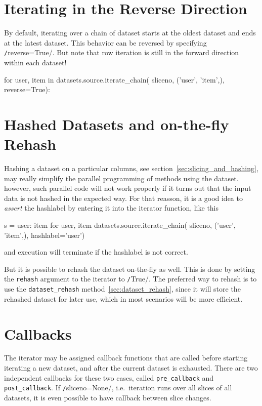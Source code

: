 \section{Iterating in the Reverse Direction}
By default, iterating over a chain of dataset starts at the oldest
dataset and ends at the latest dataset.  This behavior can be
reversed by specifying \texttt/reverse=True/.  But note
that row iteration is still in the forward direction within each
dataset!
\begin{python}
for user, item in datasets.source.iterate_chain(
    sliceno, ('user', 'item',),
    reverse=True):
\end{python}



\section{Hashed Datasets and on-the-fly Rehash}
Hashing a dataset on a particular columns, see
section~\ref{sec:slicing_and_hashing}, may really simplify the
parallel programming of methods using the dataset.  however, such
parallel code will not work properly if it turns out that the input
data is not hashed in the expected way.  For that reasson, it is a
good idea to \emph{assert} the hashlabel by entering it into the
iterator function, like this
\begin{python}
s = {user: item for user, item datasets.source.iterate_chain(
     sliceno, ('user', 'item',), hashlabel='user')}
\end{python}
and execution will terminate if the hashlabel is not correct.

But it is possible to rehash the dataset on-the-fly as well.  This is
done by setting the \texttt{rehash} argument to the iterator to
\texttt/True/.  The preferred way to rehash is to use the
\texttt{dataset\_rehash} method~\ref{sec:dataset_rehash}, since it will store the
rehashed dataset for later use, which in most scenarios will be more
efficient.






\section{Callbacks}
\label{sec:callback}
The iterator may be assigned callback functions that are called before
starting iterating a new dataset, and after the current dataset is
exhausted.  There are two independent callbacks for these two cases,
called \texttt{pre\_callback} and \texttt{post\_callback}.
If \texttt/sliceno=None/, i.e.\ iteration runs over all
slices of all datasets, it is even possible to have callback between
slice changes.

